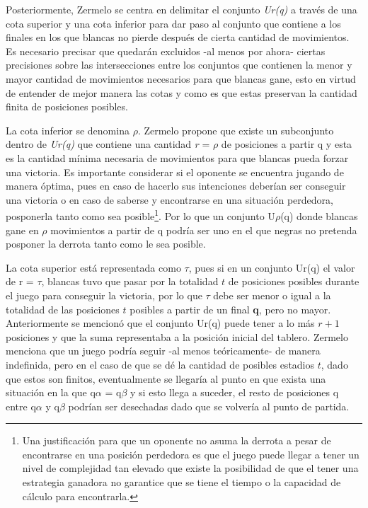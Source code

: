 \documentclass[twoside,openright,12pt,a4paper,spanish]{book}
\begin{document}
Posteriormente, Zermelo se centra en delimitar el conjunto \emph{Ur(q)} a través de una cota superior y una cota inferior para dar paso al conjunto que contiene a los finales en los que blancas no pierde después de cierta cantidad de movimientos. Es necesario precisar que quedarán excluidos -al menos por ahora- ciertas precisiones sobre las intersecciones entre los conjuntos que contienen la menor y mayor cantidad de movimientos necesarios para que blancas gane, esto en virtud de entender de mejor manera las cotas y como es que estas preservan la cantidad finita de posiciones posibles.

La cota inferior se denomina $ \rho $. Zermelo propone que existe un subconjunto dentro de \emph{Ur(q)} que contiene una cantidad \emph{r} = $ \rho $ de posiciones a partir q y esta es la cantidad mínima necesaria de movimientos para que blancas pueda forzar una victoria. Es importante considerar si el oponente se encuentra jugando de manera óptima, pues en caso de hacerlo sus intenciones deberían ser conseguir una victoria o en caso de saberse y encontrarse en una situación perdedora, posponerla tanto como sea posible\footnote{Una justificación para que un oponente no asuma la derrota a pesar de encontrarse en una posición perdedora es que el juego puede llegar a tener un nivel de complejidad tan elevado que existe la posibilidad de que el tener una estrategia ganadora no garantice que se tiene el tiempo o la capacidad de cálculo para encontrarla.}. Por lo que un conjunto U$\rho$(q) donde blancas gane en $\rho$ movimientos a partir de q podría ser uno en el que negras no pretenda posponer la derrota tanto como le sea posible. 

La cota superior está representada como $\tau$, pues si en un conjunto Ur(q) el valor de r = $\tau$, blancas tuvo que pasar por la totalidad $t$ de posiciones posibles durante el juego para conseguir la victoria, por lo que $\tau$ debe ser menor o igual a la totalidad de las posiciones $t$ posibles a partir de un final \textbf{q}, pero no mayor. Anteriormente se mencionó que el conjunto Ur(q) puede tener a lo más $r + 1$ posiciones y que la suma representaba a la posición inicial del tablero. Zermelo menciona que un juego podría seguir -al menos teóricamente- de manera indefinida, pero en el caso de que se dé la cantidad de posibles estadios $t$, dado que estos son finitos, eventualmente se llegaría al punto en que exista una situación en la que q$\alpha$ = q$\beta$ y si esto llega a suceder, el resto de posiciones q entre q$\alpha$ y q$\beta$ podrían ser desechadas dado que se volvería al punto de partida.
\end{document}
